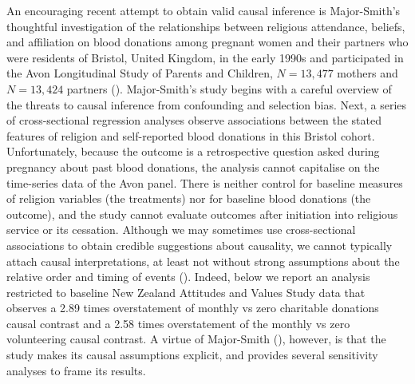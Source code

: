 \documentclass[
  single column]{article}
\begin{document}
An encouraging recent attempt to obtain valid causal inference is
Major-Smith's thoughtful investigation of the relationships between
religious attendance, beliefs, and affiliation on blood donations among
pregnant women and their partners who were residents of Bristol, United
Kingdom, in the early 1990s and participated in the Avon Longitudinal
Study of Parents and Children, \(N=13,477\) mothers and \(N=13,424\)
partners ().
Major-Smith's study begins with a careful overview of the threats to
causal inference from confounding and selection bias. Next, a series of
cross-sectional regression analyses observe associations between the
stated features of religion and self-reported blood donations in this
Bristol cohort. Unfortunately, because the outcome is a retrospective
question asked during pregnancy about past blood donations, the analysis
cannot capitalise on the time-series data of the Avon panel. There is
neither control for baseline measures of religion variables (the
treatments) nor for baseline blood donations (the outcome), and the
study cannot evaluate outcomes after initiation into religious service
or its cessation. Although we may sometimes use cross-sectional
associations to obtain credible suggestions about causality, we cannot
typically attach causal interpretations, at least not without strong
assumptions about the relative order and timing of events
(). Indeed,
below we report an analysis restricted to baseline New Zealand Attitudes
and Values Study data that observes a 2.89 times overstatement of
monthly vs zero charitable donations causal contrast and a 2.58 times
overstatement of the monthly vs zero volunteering causal contrast. A
virtue of Major-Smith (),
however, is that the study makes its causal assumptions explicit, and
provides several sensitivity analyses to frame its results.
\end{document}
